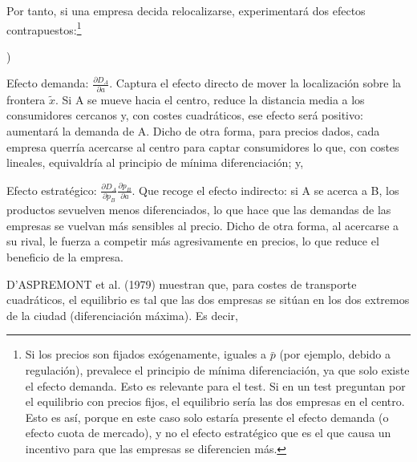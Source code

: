 \documentclass[10pt,a4paper]{article}
\newcounter{alphaitem}
\newenvironment{la}
      {\begin{list}{\alph{alphaitem})}{%
          \usecounter{alphaitem}%
          \setlength{\leftmargin}{1cm}%
          \setlength{\parskip}{3pt}%
          \setlength{\itemsep}{0pt}%
          \setlength{\parsep}{0pt}%
      }}
      {\end{list}}
\begin{document}
Por tanto, si una empresa decida relocalizarse, experimentará dos efectos contrapuestos:\footnote{%
    Si los precios son fijados exógenamente, iguales a $\bar p$ (por ejemplo, debido a regulación), prevalece el principio de mínima diferenciación, ya que solo existe el efecto demanda. Esto es relevante para el test. Si en un test preguntan por el equilibrio con precios fijos, el equilibrio sería las dos empresas en el centro. Esto es así, porque en este caso solo estaría presente el efecto demanda (o efecto cuota de mercado), y no el efecto estratégico que es el que causa un incentivo para que las empresas se diferencien más.
}
\begin{la}
    \item Efecto demanda: $\frac{\partial D_A}{\partial a}$. Captura el efecto directo de mover la localización sobre la frontera $\tilde x$. Si A se mueve hacia el centro, reduce la distancia media a los consumidores cercanos y, con costes cuadráticos, ese efecto será positivo: aumentará la demanda de A. Dicho de otra forma, para precios dados, cada empresa querría acercarse al centro para captar consumidores lo que, con costes lineales, equivaldría al principio de mínima diferenciación; y,
    \item Efecto estratégico: $\frac{\partial D_A}{\partial p_B}\frac{\partial p_B}{\partial a}$. Que recoge el efecto indirecto: si A se acerca a B, los productos sevuelven menos diferenciados, lo que hace que las demandas de las empresas se vuelvan más sensibles al precio. Dicho de otra forma, al acercarse a su rival, le fuerza a competir más agresivamente en precios, lo que reduce el beneficio de la empresa. 
\end{la}

D’ASPREMONT et al. (1979) muestran que, para costes de transporte cuadráticos, el equilibrio es tal que las dos empresas se sitúan en los dos extremos de la ciudad (diferenciación máxima). Es decir, 
\end{document}
